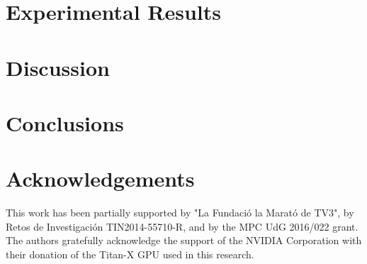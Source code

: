 \documentclass[11pt, authoryear,twocolumn, final]{elsarticle}
\begin{document}
\section{Experimental Results}




\section{Discussion}
\label{sec:discussion}


\section{Conclusions}


\section*{Acknowledgements}
This work has been partially supported by "La Fundaci\'{o} la Marat\'{o} de TV3", by Retos de Investigaci\'{o}n TIN2014-55710-R, and by the MPC UdG 2016/022 grant. The authors  gratefully acknowledge the support of the NVIDIA Corporation with their donation of the Titan-X GPU used in this research.

\label{sec:conclusion}


\end{document}
